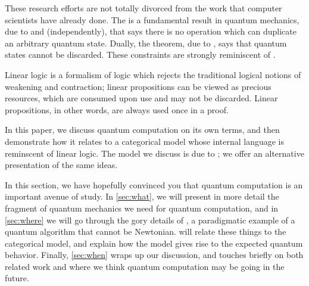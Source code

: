 These research efforts are not totally divorced from the work that computer
scientists have already done.  The  is a fundamental
result in quantum mechanics, due to  and
 (independently), that says there is no operation which can
duplicate an arbitrary quantum state.  Dually, the  theorem,
due to , says that quantum states cannot be discarded.  These
constraints are strongly reminiscent of .

Linear logic is a formalism of logic which rejects the traditional logical
notions of weakening and contraction; linear propositions can be viewed as
precious resources, which are consumed upon use and may not be discarded.
Linear propositions, in other words, are always used once in a proof.

In this paper, we discuss quantum computation on its own terms, and then
demonstrate how it relates to a categorical model whose internal language is
reminscent of linear logic.  The model we discuss is due to ; we offer an alternative presentation of
the same ideas.

In this section, we have hopefully convinced you that quantum computation is an
important avenue of study.  In \cref{sec:what}, we will present in more detail
the fragment of quantum mechanics we need for quantum computation, and in
\cref{sec:where} we will go through the gory details of , a paradigmatic example of a quantum algorithm that cannot be
Newtonian.   will relate these things to the categorical model,
and explain how the model gives rise to the expected quantum behavior.  Finally,
\cref{sec:when} wraps up our discussion, and touches briefly on both related
work and where we think quantum computation may be going in the future.
